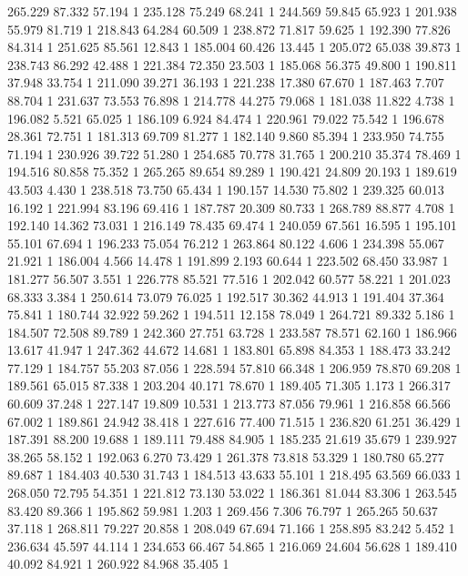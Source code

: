 	265.229	87.332	57.194	1
	235.128	75.249	68.241	1
	244.569	59.845	65.923	1
	201.938	55.979	81.719	1
	218.843	64.284	60.509	1
	238.872	71.817	59.625	1
	192.390	77.826	84.314	1
	251.625	85.561	12.843	1
	185.004	60.426	13.445	1
	205.072	65.038	39.873	1
	238.743	86.292	42.488	1
	221.384	72.350	23.503	1
	185.068	56.375	49.800	1
	190.811	37.948	33.754	1
	211.090	39.271	36.193	1
	221.238	17.380	67.670	1
	187.463	7.707	88.704	1
	231.637	73.553	76.898	1
	214.778	44.275	79.068	1
	181.038	11.822	4.738	1
	196.082	5.521	65.025	1
	186.109	6.924	84.474	1
	220.961	79.022	75.542	1
	196.678	28.361	72.751	1
	181.313	69.709	81.277	1
	182.140	9.860	85.394	1
	233.950	74.755	71.194	1
	230.926	39.722	51.280	1
	254.685	70.778	31.765	1
	200.210	35.374	78.469	1
	194.516	80.858	75.352	1
	265.265	89.654	89.289	1
	190.421	24.809	20.193	1
	189.619	43.503	4.430	1
	238.518	73.750	65.434	1
	190.157	14.530	75.802	1
	239.325	60.013	16.192	1
	221.994	83.196	69.416	1
	187.787	20.309	80.733	1
	268.789	88.877	4.708	1
	192.140	14.362	73.031	1
	216.149	78.435	69.474	1
	240.059	67.561	16.595	1
	195.101	55.101	67.694	1
	196.233	75.054	76.212	1
	263.864	80.122	4.606	1
	234.398	55.067	21.921	1
	186.004	4.566	14.478	1
	191.899	2.193	60.644	1
	223.502	68.450	33.987	1
	181.277	56.507	3.551	1
	226.778	85.521	77.516	1
	202.042	60.577	58.221	1
	201.023	68.333	3.384	1
	250.614	73.079	76.025	1
	192.517	30.362	44.913	1
	191.404	37.364	75.841	1
	180.744	32.922	59.262	1
	194.511	12.158	78.049	1
	264.721	89.332	5.186	1
	184.507	72.508	89.789	1
	242.360	27.751	63.728	1
	233.587	78.571	62.160	1
	186.966	13.617	41.947	1
	247.362	44.672	14.681	1
	183.801	65.898	84.353	1
	188.473	33.242	77.129	1
	184.757	55.203	87.056	1
	228.594	57.810	66.348	1
	206.959	78.870	69.208	1
	189.561	65.015	87.338	1
	203.204	40.171	78.670	1
	189.405	71.305	1.173	1
	266.317	60.609	37.248	1
	227.147	19.809	10.531	1
	213.773	87.056	79.961	1
	216.858	66.566	67.002	1
	189.861	24.942	38.418	1
	227.616	77.400	71.515	1
	236.820	61.251	36.429	1
	187.391	88.200	19.688	1
	189.111	79.488	84.905	1
	185.235	21.619	35.679	1
	239.927	38.265	58.152	1
	192.063	6.270	73.429	1
	261.378	73.818	53.329	1
	180.780	65.277	89.687	1
	184.403	40.530	31.743	1
	184.513	43.633	55.101	1
	218.495	63.569	66.033	1
	268.050	72.795	54.351	1
	221.812	73.130	53.022	1
	186.361	81.044	83.306	1
	263.545	83.420	89.366	1
	195.862	59.981	1.203	1
	269.456	7.306	76.797	1
	265.265	50.637	37.118	1
	268.811	79.227	20.858	1
	208.049	67.694	71.166	1
	258.895	83.242	5.452	1
	236.634	45.597	44.114	1
	234.653	66.467	54.865	1
	216.069	24.604	56.628	1
	189.410	40.092	84.921	1
	260.922	84.968	35.405	1
